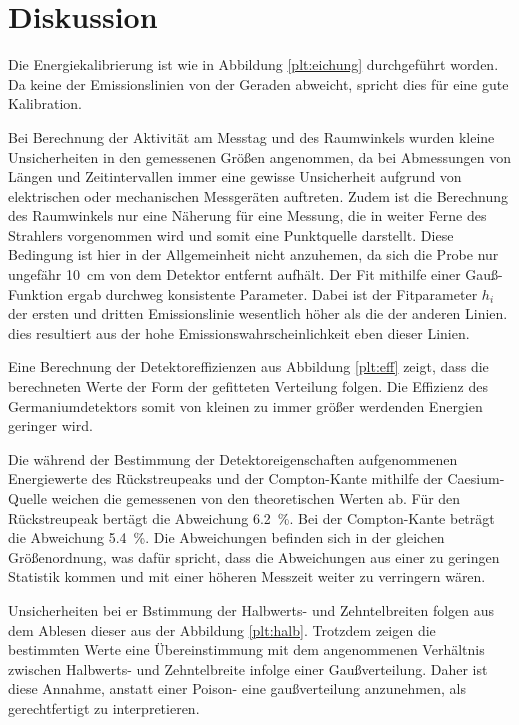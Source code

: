 \section{Diskussion}
\label{sec:Diskussion}
Die Energiekalibrierung ist wie in Abbildung \ref{plt:eichung} durchgeführt worden.
Da keine der Emissionslinien von der Geraden abweicht, spricht dies für eine gute
Kalibration.

Bei Berechnung der Aktivität am Messtag und des Raumwinkels wurden kleine Unsicherheiten
in den gemessenen Größen angenommen, da bei Abmessungen von Längen und Zeitintervallen
immer eine gewisse Unsicherheit aufgrund von elektrischen oder mechanischen Messgeräten
auftreten. Zudem ist die Berechnung des Raumwinkels nur eine Näherung für eine Messung,
die in weiter Ferne des Strahlers vorgenommen wird und somit eine Punktquelle darstellt.
Diese Bedingung ist hier in der Allgemeinheit nicht anzuhemen, da sich die Probe nur
ungefähr \SI{10}{\centi\meter} von dem Detektor entfernt aufhält.
Der Fit mithilfe einer Gauß-Funktion ergab durchweg konsistente Parameter. Dabei
ist der Fitparameter $h_i$ der ersten und dritten Emissionslinie wesentlich höher
als die der anderen Linien. dies resultiert aus der hohe Emissionswahrscheinlichkeit
eben dieser Linien.

Eine Berechnung der Detektoreffizienzen aus Abbildung \ref{plt:eff} zeigt,
dass die berechneten Werte der Form der gefitteten Verteilung folgen. Die Effizienz
des Germaniumdetektors somit von kleinen zu immer größer werdenden Energien geringer
wird.

Die während der Bestimmung der Detektoreigenschaften aufgenommenen Energiewerte des
Rückstreupeaks und der Compton-Kante mithilfe der Caesium-Quelle weichen die gemessenen
von den theoretischen Werten ab. Für den
Rückstreupeak bertägt die Abweichung \SI{6.2}{\percent}. Bei der Compton-Kante beträgt
die Abweichung \SI{5.4}{\percent}. Die Abweichungen befinden sich in der gleichen
Größenordnung, was dafür spricht, dass die Abweichungen aus einer zu geringen Statistik
kommen und mit einer höheren Messzeit weiter zu verringern wären.

Unsicherheiten bei er Bstimmung der Halbwerts- und Zehntelbreiten folgen aus dem
Ablesen dieser aus der Abbildung \ref{plt:halb}. Trotzdem zeigen die bestimmten Werte
eine Übereinstimmung mit dem angenommenen Verhältnis zwischen Halbwerts- und
Zehntelbreite infolge einer Gaußverteilung. Daher ist diese Annahme, anstatt einer Poison-
eine gaußverteilung anzunehmen, als gerechtfertigt zu interpretieren.

